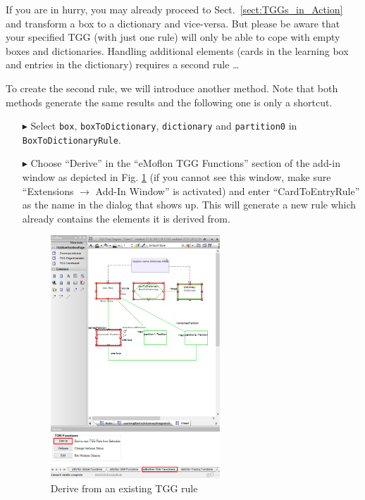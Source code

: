 If you are in hurry, you may already proceed to Sect.~\ref{sect:TGGs_in_Action} and transform a box to a dictionary and vice-versa.
But please be aware that your specified TGG (with just one rule) will only be able to cope with empty boxes and dictionaries.
Handling additional elements (cards in the learning box and entries in the dictionary) requires a second rule \ldots

To create the second rule, we will introduce another method. Note that both methods generate the same results and the following one is only a shortcut.

\begin{enumerate}
  \item[$\blacktriangleright$] Select \texttt{box}, \texttt{boxToDictionary}, \texttt{dictionary} and \texttt{partition0} in \texttt{BoxToDictionaryRule}.
  \item[$\blacktriangleright$] Choose ``Derive'' in the ``eMoflon TGG Functions'' section of the add-in window as depicted in Fig. \ref{fig:derive_from_tgg_rule} (if you cannot see this window, make sure ``Extensions $\rightarrow$ Add-In Window'' is activated) and enter ``CardToEntryRule'' as the name in the dialog that shows up. This will generate a new rule which already contains the elements it is derived from.

  \begin{figure}[htbp]
  \begin{center}
    \includegraphics[width=0.6\textwidth]{pics/tggBilder/tggRule/derive_tgg_rule.png}
    \caption{Derive from an existing TGG rule}
    \label{fig:derive_from_tgg_rule}
  \end{center}
  \end{figure}
  \FloatBarrier


\end{enumerate}
